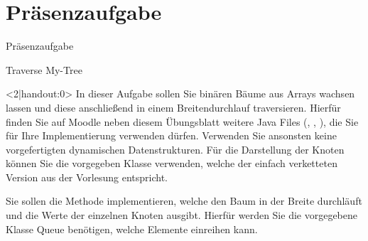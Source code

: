 \section{Präsenzaufgabe}
{
\begin{frame}[fragile,c]{Präsenzaufgabe}
\begin{aufgabe}{Traverse My-Tree}
\begin{onlyenv}<2|handout:0>
    In dieser Aufgabe sollen Sie binären Bäume aus Arrays wachsen lassen und diese anschließend in einem Breitendurchlauf traversieren. Hierfür finden Sie auf Moodle neben diesem  Übungsblatt weitere Java Files (, , ), die Sie für Ihre Implementierung verwenden dürfen. Verwenden Sie
    ansonsten keine vorgefertigten dynamischen Datenstrukturen. Für die Darstellung der Knoten können Sie die vorgegeben Klasse  verwenden, welche der einfach verketteten Version aus der Vorlesung entspricht.

    Sie sollen die Methode  implementieren, welche den Baum in der Breite durchläuft und die Werte der einzelnen Knoten ausgibt. Hierfür werden Sie die vorgegebene Klasse Queue benötigen, welche  Elemente einreihen kann.


\end{onlyenv}
\end{aufgabe}
\end{frame}}
